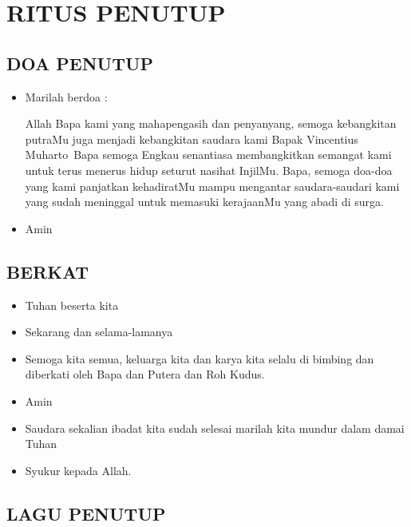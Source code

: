 \documentclass[a5paper,headsepline,titlepage,11pt,nnormalheadings,DIVcalc]{scrbook}
\newcommand{\BU}[1]{\begin{itemize} \item[U:] #1 \end{itemize}}
\newcommand{\BP}[1]{\begin{itemize} \item[P:] #1 \end{itemize}}
\newcommand{\namaalm}{Bapak Vincentius Muharto~}
\begin{document}
\section*{RITUS PENUTUP}

\subsection*{DOA PENUTUP}
\BP{Marilah berdoa :
 
Allah Bapa kami yang mahapengasih dan penyanyang, 
semoga kebangkitan putraMu juga menjadi kebangkitan 
saudara kami \namaalm  Bapa semoga Engkau senantiasa 
membangkitkan semangat kami untuk terus menerus hidup 
seturut nasihat InjilMu. Bapa, semoga doa-doa yang kami 
panjatkan kehadiratMu mampu mengantar saudara-saudari 
kami yang sudah meninggal untuk memasuki kerajaanMu 
yang abadi di surga. }
\BU{Amin} 

\subsection*{BERKAT}
\BP{Tuhan beserta kita}
\BU{Sekarang dan selama-lamanya}
\BP{Semoga kita semua, keluarga kita dan karya kita selalu di bimbing dan diberkati oleh Bapa dan Putera dan Roh Kudus.}

\BU{Amin}

\BP{Saudara sekalian ibadat kita sudah selesai marilah kita mundur dalam damai Tuhan}
\BU{Syukur kepada Allah.}

\subsection*{LAGU PENUTUP}
\end{document}
